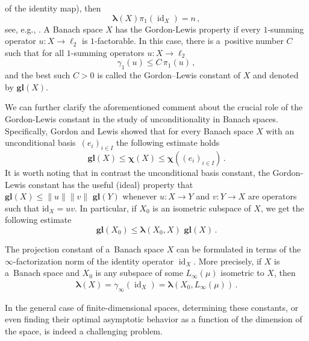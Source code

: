 \documentclass[12pt]{amsart}
\numberwithin{subsection}{section}
\theoremstyle{definition}
\theoremstyle{remark}
\DeclareMathOperator{\id}{\mathrm{id}}
\begin{document}
of the identity map), then
\begin{equation*}
\boldsymbol{\lambda}(X)\pi_1(\id_X)= n\,,
\end{equation*}
see, e.g., \cite{garlinggordon,konig1990bounds}. A Banach space $X$ has the Gordon-Lewis property if every $1$-summing operator
$u\colon X \to \ell_2$ is $1$-factorable. In this case, there is a~positive number $C$ such that for all $1$-summing operators
$u \colon X \to \ell_2$
\begin{equation*}
\label{eq: def G-L}
\gamma_1(u)\leq C\,\pi_1(u)\,,
\end{equation*}
and the best such $C>0$ is called the Gordon--Lewis constant of $X$ and denoted by $\boldsymbol{g\!l}(X)$.

We can further clarify the aforementioned comment about the crucial role of the Gordon-Lewis constant in the study of unconditionality
in Banach spaces. Specifically, Gordon and Lewis \cite{gordon1974absolutely} showed  that for every Banach space $X$ with
an unconditional basis~$(e_i)_{i \in I}$ the following estimate holds
\begin{equation} \label{gl-inequality}
\boldsymbol{g\!l}(X)\leq  \boldsymbol{\chi}(X) \leq \boldsymbol{\chi}( (e_i)_{i \in I})\,.
\end{equation}
It is worth noting that in contrast the unconditional basis constant, the Gordon-Lewis constant has the useful (ideal)
property that $\boldsymbol{g\!l}(X)\leq \|u\|  \|v\|\,\,\boldsymbol{g\!l}(Y)$ whenever $u\colon X \to Y$ and
$v\colon Y \to X$ are operators such that $\text{id}_{X} = uv$. In particular, if $X_0$ is an isometric subspace of $X$,
we get the following estimate
\begin{equation*}
\boldsymbol{g\!l}(X_0)\leq \boldsymbol{\lambda}(X_0,X)\,\, \boldsymbol{g\!l}(X)\,.
\end{equation*}


The projection constant of a~Banach space $X$ can be formulated in terms of the  $\infty$-factorization norm of the identity
operator $\id_X$.  More precisely, if $X$ is a~Banach space and $X_0$
is any subspace of some $L_{\infty}(\mu)$ isometric to $X$, then
\begin{align} \label{gammainfty}
\boldsymbol{\lambda}(X)= \gamma_\infty(\id_X)= \boldsymbol{\lambda}(X_0, L_{\infty}(\mu))\,.
\end{align}


In the general case of finite-dimensional spaces, determining these constants, or even finding their optimal asymptotic behavior
as a function of the dimension of the space, is indeed a challenging problem.
\end{document}
